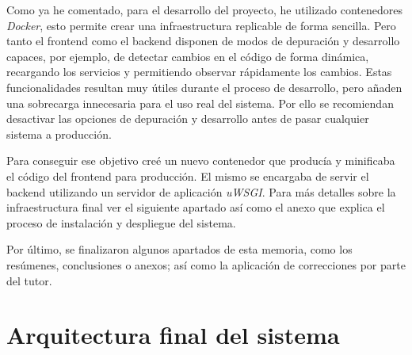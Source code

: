 Como ya he comentado, para el desarrollo del proyecto, he utilizado contenedores \textit{Docker}, esto permite crear una infraestructura replicable de forma sencilla. Pero tanto el \gls{frontend} como el \gls{backend} disponen de modos de depuración y desarrollo capaces, por ejemplo, de detectar cambios en el código de forma dinámica, recargando los servicios y permitiendo observar rápidamente los cambios. Estas funcionalidades resultan muy útiles durante el proceso de desarrollo, pero añaden una sobrecarga innecesaria para el uso real del sistema. Por ello se recomiendan desactivar las opciones de depuración y desarrollo antes de pasar cualquier sistema a producción. 

Para conseguir ese objetivo creé un nuevo contenedor que producía y minificaba el código del \gls{frontend} para producción. El mismo se encargaba de servir el \gls{backend} utilizando un servidor de aplicación \textit{uWSGI}. Para más detalles sobre la infraestructura final ver el siguiente apartado así como el anexo que explica el proceso de instalación y despliegue del sistema.

Por último, se finalizaron algunos apartados de esta memoria, como los resúmenes, conclusiones o anexos; así como la aplicación de correcciones por parte del tutor.

\section{Arquitectura final del sistema}

